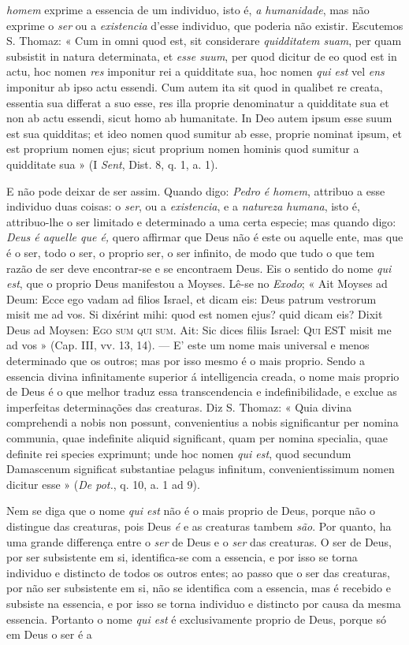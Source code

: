 \emph{homem} exprime a essencia de um individuo, isto é, \emph{a humanidade}, mas não exprime o \emph{ser} ou a \emph{existencia} d'esse individuo, que poderia não existir. Escutemos S. Thomaz: « Cum in omni quod est, sit considerare \emph{quidditatem suam}, per quam subsistit in natura determinata, et \emph{esse suum}, per quod dicitur de eo quod est in actu, hoc nomen \emph{res} imponitur rei a quidditate sua, hoc nomen \emph{qui est} vel \emph{ens} imponitur ab ipso actu essendi. Cum autem ita sit quod in qualibet re creata, essentia sua differat a suo esse, res illa proprie denominatur a quidditate sua et non ab actu essendi, sicut homo ab humanitate. In Deo autem ipsum esse suum est sua quidditas; et ideo nomen quod sumitur ab esse, proprie nominat ipsum, et est proprium nomen ejus; sicut proprium nomen hominis quod sumitur a quidditate sua » (I \emph{Sent}, Dist. 8, q. 1, a. 1).\par E não pode deixar de ser assim. Quando digo: \emph{Pedro é homem}, attribuo a esse individuo duas coisas: o \emph{ser}, ou a \emph{existencia}, e a \emph{natureza humana}, isto é, attribuo-lhe o ser limitado e determinado a uma certa especie; mas quando digo: \emph{Deus é aquelle que é,} quero affirmar que Deus não é este ou aquelle ente, mas que é o ser, todo o ser, o proprio ser, o ser infinito, de modo que tudo o que tem razão de ser deve encontrar-se e se encontraem Deus. Eis o sentido do nome \emph{qui est}, que o proprio Deus manifestou a Moyses. Lê-se no \emph{Exodo}; « Ait Moyses ad Deum: Ecce ego vadam ad filios Israel, et dicam eis: Deus patrum vestrorum misit me ad vos. Si dixérint mihi: quod est nomen ejus? quid dicam eis? Dixit Deus ad Moysen: \textsc{Ego sum qui sum}. Ait: Sic dices filiis Israel: \textsc{Qui EST} misit me ad vos » (Cap. III, vv. 13, 14). --- E' este um nome mais universal e menos determinado que os outros; mas por isso mesmo é o mais proprio. Sendo a essencia divina infinitamente superior á intelligencia creada, o nome mais proprio de Deus é o que melhor traduz essa transcendencia e indefinibilidade, e exclue as imperfeitas determinações das creaturas. Diz S. Thomaz: « Quia divina comprehendi a nobis non possunt, convenientius a nobis significantur per nomina communia, quae indefinite aliquid significant, quam per nomina specialia, quae definite rei species exprimunt; unde hoc nomen \emph{qui est}, quod secundum Damascenum significat substantiae pelagus infinitum, convenientissimum nomen dicitur esse » (\emph{De pot.}, q. 10, a. 1 ad 9).\par Nem se diga que o nome \emph{qui est} não é o mais proprio de Deus, porque não o distingue das creaturas, pois Deus \emph{é} e as creaturas tambem \emph{são}. Por quanto, ha uma grande differença entre o \emph{ser} de Deus e o \emph{ser} das creaturas. O ser de Deus, por ser subsistente em si, identifica-se com a essencia, e por isso se torna individuo e distincto de todos os outros entes; ao passo que o ser das creaturas, por não ser subsistente em si, não se identifica com a essencia, mas é recebido e subsiste na essencia, e por isso se torna individuo e distincto por causa da mesma essencia. Portanto o nome \emph{qui est} é exclusivamente proprio de Deus, porque só em Deus o ser é a 